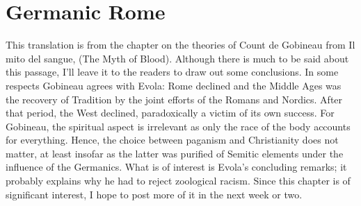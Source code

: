\section{Germanic Rome}

This translation is from the chapter on the theories of Count de Gobineau from Il mito del sangue, (The Myth of Blood). Although there is much to be said about this passage, I'll leave it to the readers to draw out some conclusions. In some respects Gobineau agrees with Evola: Rome declined and the Middle Ages was the recovery of Tradition by the joint efforts of the Romans and Nordics. After that period, the West declined, paradoxically a victim of its own success. For Gobineau, the spiritual aspect is irrelevant as only the race of the body accounts for everything. Hence, the choice between paganism and Christianity does not matter, at least insofar as the latter was purified of Semitic elements under the influence of the Germanics. What is of interest is Evola's concluding remarks; it probably explains why he had to reject zoological racism. Since this chapter is of significant interest, I hope to post more of it in the next week or two.


